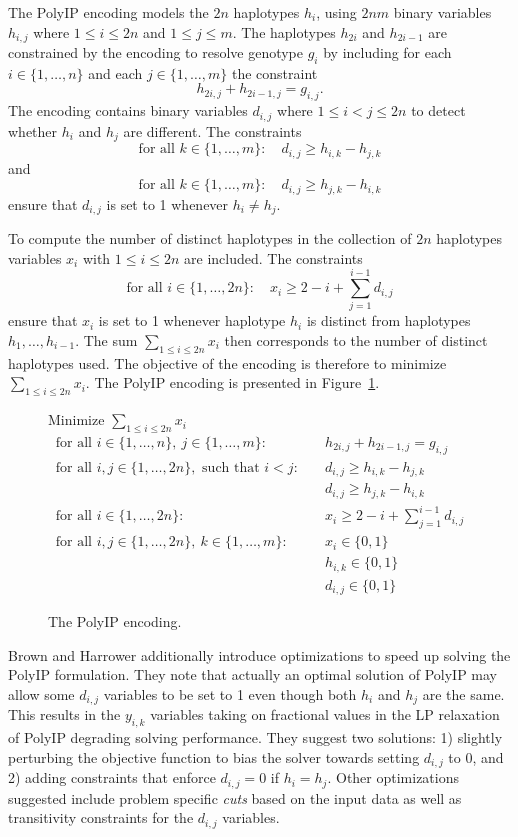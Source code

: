\documentclass[12pt,a4paper]{article}
\begin{document}
The PolyIP encoding models the $2n$ haplotypes $h_i$, using $2nm$ binary variables $h_{i,j}$ where $1\leq i \leq 2n$ and $1\leq j \leq m$.
The haplotypes $h_{2i}$ and $h_{2i-1}$ are constrained by the encoding to resolve genotype $g_i$ by including for each $i\in\{1, \dots , n\}$ and each $j\in\{1,\dots ,m\}$ the constraint
$$ h_{2i,j} + h_{2i-1,j} = g_{i,j}. $$
The encoding contains binary variables $d_{i,j}$ where $1\leq i<j\leq 2n$ to detect whether $h_i$ and $h_j$ are different.
The constraints 
$$ \text{for all }k\in\{1,\dots ,m\}:\quad  d_{i,j} \geq h_{i,k}-h_{j,k} $$
and
$$ \text{for all }k\in\{1,\dots ,m\}:\quad  d_{i,j} \geq h_{j,k}-h_{i,k} $$
ensure that $d_{i,j}$ is set to 1 whenever $h_i\neq h_j$.

To compute the number of distinct haplotypes in the collection of $2n$ haplotypes variables $x_i$ with $1\leq i\leq 2n$ are included.
The constraints
$$ \text{for all }i\in\{1,\dots ,2n\}:\quad  x_{i} \geq 2 - i  + \sum_{j=1}^{i-1} d_{i,j} $$
ensure that $x_i$ is set to 1 whenever haplotype $h_i$ is distinct from haplotypes $h_1,\dots , h_{i-1}$.
The sum $\sum_{1\leq i\leq 2n} x_i$ then corresponds to the number of distinct haplotypes used.
The objective of the encoding is therefore to minimize $\sum_{1\leq i\leq 2n} x_i$.
The PolyIP encoding is presented in Figure~\ref{fig:enc-polyip}.

\begin{figure}
\begin{mdframed}
\centering
Minimize $\sum_{1\leq i \leq 2n} x_i$
\begin{align}
\text{for all  }i\in\{1,\dots , n\},\ j\in\{1,\dots ,m\}:&\quad h_{2i,j} + h_{2i-1,j} = g_{i,j} \\
\text{for all  }i, j\in\{1,\dots , 2n\},\text{ such that } i<j:&\quad d_{i,j} \geq h_{i,k}-h_{j,k} \\
&\quad d_{i,j} \geq h_{j,k}-h_{i,k} \\
\text{for all  }i\in\{1,\dots , 2n\}:&\quad x_{i} \geq 2 - i +  \sum_{j=1}^{i-1} d_{i,j} \\
\text{for all  }i,j\in\{1,\dots , 2n\},\ k\in\{1,\dots ,m\}:&\quad x_i\in\{0,1\} \\
&\quad h_{i,k}\in\{0,1\} \\
&\quad d_{i,j}\in\{0,1\}
\end{align}
\end{mdframed}
\caption{The PolyIP encoding.}
\label{fig:enc-polyip}
\end{figure}

Brown and Harrower additionally introduce optimizations to speed up solving the PolyIP formulation.
They note that actually an optimal solution of PolyIP may allow some $d_{i,j}$ variables to be set to 1 even though both $h_i$ and $h_j$ are the same.  
This results in the $y_{i,k}$ variables taking on fractional values in the LP relaxation of PolyIP degrading solving performance.
They suggest two solutions: 1) slightly perturbing the objective function to bias the solver towards setting $d_{i,j}$ to 0, 
and 2) adding constraints that enforce $d_{i,j}=0$ if $h_i=h_j$.
Other optimizations suggested include problem specific \emph{cuts} based on the input data as well as transitivity constraints for the $d_{i,j}$ variables.
\end{document}
